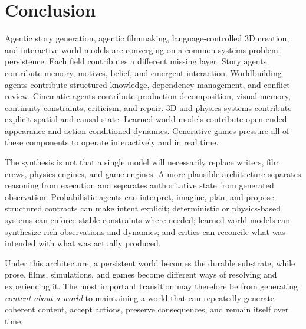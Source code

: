\documentclass{article}
\begin{document}
\section{Conclusion}

Agentic story generation, agentic filmmaking, language-controlled 3D creation, and interactive world models are converging on a common systems problem: persistence. Each field contributes a different missing layer. Story agents contribute memory, motives, belief, and emergent interaction. Worldbuilding agents contribute structured knowledge, dependency management, and conflict review. Cinematic agents contribute production decomposition, visual memory, continuity constraints, criticism, and repair. 3D and physics systems contribute explicit spatial and causal state. Learned world models contribute open-ended appearance and action-conditioned dynamics. Generative games pressure all of these components to operate interactively and in real time.

The synthesis is not that a single model will necessarily replace writers, film crews, physics engines, and game engines. A more plausible architecture separates reasoning from execution and separates authoritative state from generated observation. Probabilistic agents can interpret, imagine, plan, and propose; structured contracts can make intent explicit; deterministic or physics-based systems can enforce stable constraints where needed; learned world models can synthesize rich observations and dynamics; and critics can reconcile what was intended with what was actually produced.

Under this architecture, a persistent world becomes the durable substrate, while prose, films, simulations, and games become different ways of resolving and experiencing it. The most important transition may therefore be from generating \emph{content about a world} to maintaining a world that can repeatedly generate coherent content, accept actions, preserve consequences, and remain itself over time.



\end{document}
